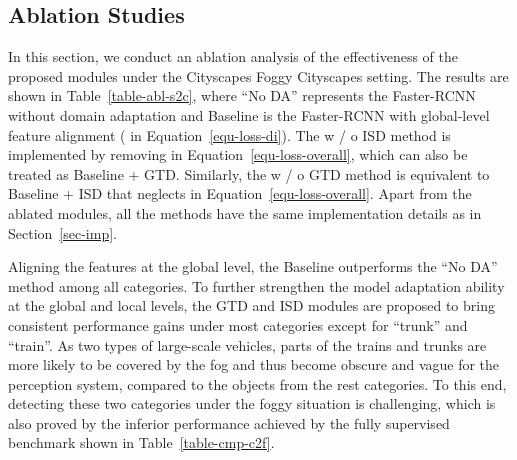 \documentclass[journal]{IEEEtran}
\begin{document}
\subsection{Ablation Studies}

In this section, we conduct an ablation analysis of the effectiveness of the proposed modules under the Cityscapes  Foggy Cityscapes setting. The results are shown in Table~\ref{table-abl-s2c}, where ``No DA'' represents the Faster-RCNN without domain adaptation and Baseline is the Faster-RCNN with global-level feature alignment ( in Equation~\ref{equ-loss-di}). The w / o ISD method is implemented by removing  in Equation~\ref{equ-loss-overall}, which can also be treated as Baseline + GTD. Similarly, the  w / o GTD method is equivalent to Baseline + ISD that neglects  in Equation~\ref{equ-loss-overall}. Apart from the ablated modules, all the methods have the same implementation details as in Section~\ref{sec-imp}.


\begin{table*}[!htb]
\centering
\caption{Ablation studies for the GTD and ISD modules on the CityScapes  Foggy Cityscapes experiment.}
\label{table-abl-s2c}
\end{table*}

Aligning the features at the global level, the Baseline outperforms the ``No DA'' method among all categories. To further strengthen the model adaptation ability at the global and local levels, the GTD and ISD modules are proposed to bring consistent performance gains under most categories except for ``trunk'' and ``train''. As two types of large-scale vehicles, parts of the trains and trunks are more likely to be covered by the fog and thus become obscure and vague for the perception system, compared to the objects from the rest categories. To this end, detecting these two categories under the foggy situation is challenging, which is also proved by the inferior performance achieved by the fully supervised benchmark shown in Table~\ref{table-cmp-c2f}. 
\end{document}
